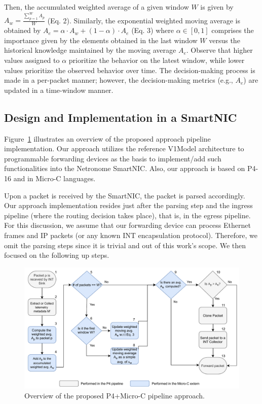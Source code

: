Then, the accumulated weighted average of a given window $W$ is given by $A_w = \frac{\sum_{p = 1}^{W} A_p}{W}$ (Eq. 2). Similarly, the exponential weighted moving average is obtained by $A_e = \alpha \cdot A_w + (1 - \alpha) \cdot A_e$ (Eq. 3) where $\alpha \in [0,1]$ comprises the importance given by the elements obtained in the last window $W$ versus the historical knowledge maintained by the moving average $A_e$. Observe that higher values assigned to $\alpha$ prioritize the behavior on the latest window, while lower values prioritize the observed behavior over time. The decision-making process is made in a per-packet manner; however, the decision-making metrics (e.g., $A_e$) are updated in a time-window manner.


\subsection{Design and Implementation in a SmartNIC}


Figure~\ref{fig-overview} illustrates an overview of the proposed approach pipeline implementation. Our approach utilizes the reference V1Model architecture to programmable forwarding devices as the basis to implement/add such functionalities into the Netronome SmartNIC. Also, our approach is based on P4-16 and in Micro-C languages. 

Upon a packet is received by the SmartNIC, the packet is parsed accordingly. Our approach implementation resides just after the parsing step and the ingress pipeline (where the routing decision takes place), that is, in the egress pipeline. For this discussion, we assume that our forwarding device can process Ethernet frames and IP packets (or any known INT encapsulation protocol). Therefore, we omit the parsing steps since it is trivial and out of this work's scope. We then focused on the following up steps.   

\begin{figure}[t]
\centering
        \includegraphics[scale=0.38]{aina-img/apf-overview.pdf}
        \caption{Overview of the proposed P4+Micro-C pipeline approach.}
        \label{fig-overview}
\end{figure}

